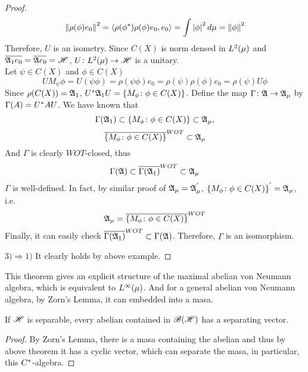 \documentclass[a4paper,11pt]{report}
\begin{document}
\begin{proof}
	\begin{equation*}
		\left\lVert\rho(\phi)e_0\right\lVert^2 = \langle \rho(\phi^{*})\rho(\phi)e_0,e_0 \rangle = \int \left\lvert\phi\right\lvert^2 d \mu = \left\lVert\phi\right\lVert^2
	\end{equation*}
	Therefore, $U$ is an isometry. Since $C(X)$ is norm densed in $L^{2}(\mu)$ and $\overline{\mathfrak{A}_1 e_0} = \overline{\mathfrak{A} e_0} = \mathscr{H}$, $U \colon L^{2}(\mu) \rightarrow \mathscr{H}$ is a unitary. \\
	Let $\psi \in C(X)$ and $\phi \in C(X)$
	\begin{equation*}
		UM_{\psi}\phi = U(\psi\phi) = \rho(\psi\phi)e_0 = \rho(\psi) \rho(\phi)e_0 = \rho(\psi) U \phi  
	\end{equation*}
	Since $\rho(C(X)) = \mathfrak{A}_1$, $U^{*} \mathfrak{A}_1 U = \{M_{\phi} \colon \phi \in C(X)\}$.
	Define the map $\Gamma \colon \mathfrak{A} \rightarrow \mathfrak{A}_{\mu}$ by $\Gamma(A) = U^{*} A U$. We have known that
	\begin{equation*}
		 \Gamma(\mathfrak{A}_1) \subset \{M_{\phi} \colon \phi \in C(X)\} \subset \mathfrak{A}_{\mu},
	\end{equation*}
	\begin{equation*}
		\overline{\{M_{\phi} \colon \phi \in C(X)\}}^{WOT} \subset \mathfrak{A}_{\mu}
	\end{equation*}
	And $\Gamma$ is clearly $WOT$-closed, thus 
	\begin{equation*}
		\Gamma(\mathfrak{A}) \subset \overline{\Gamma(\mathfrak{A}_1)}^{WOT} \subset \mathfrak{A}_{\mu}
	\end{equation*}
	$\Gamma$ is well-defined.
	In fact, by similar proof of $\mathfrak{A}_{\mu}=\mathfrak{A}_{\mu}^{'}$, ${\{M_{\phi} \colon \phi \in C(X)\}}^{'} = \mathfrak{A}_{\mu}$, i.e. 
	\begin{equation*}
		\mathfrak{A}_{\mu} = \overline{\{M_{\phi} \colon \phi \in C(X)\}}^{WOT}
	\end{equation*}
	Finally, it can easily check $\overline{\Gamma(\mathfrak{A}_1)}^{WOT} \subset \Gamma(\mathfrak{A})$. Therefore, $\Gamma$ is an isomorphism.
	\item $3) \Rightarrow 1)$ It clearly holds by above example.
\end{proof}


This theorem gives an explicit structure of the maximal abelian von Neumann algebra, which is equivalent to $L^{\infty}(\mu)$. And for a general abelian von Neumann algebra, by Zorn's Lemma, it can embedded into a masa.

\begin{cor} \label{cor9}
	If $\mathscr{H}$ is separable, every abelian \Cs contained in $\mathscr{B(H)}$ has a separating vector.
\end{cor}
\begin{proof}
	By Zorn's Lemma, there is a masa containing the abelian \Cs and thus by above theorem it has a cyclic vector, which can separate the masa, in particular, this $C^{*}$-algebra.
\end{proof}
\end{document}
